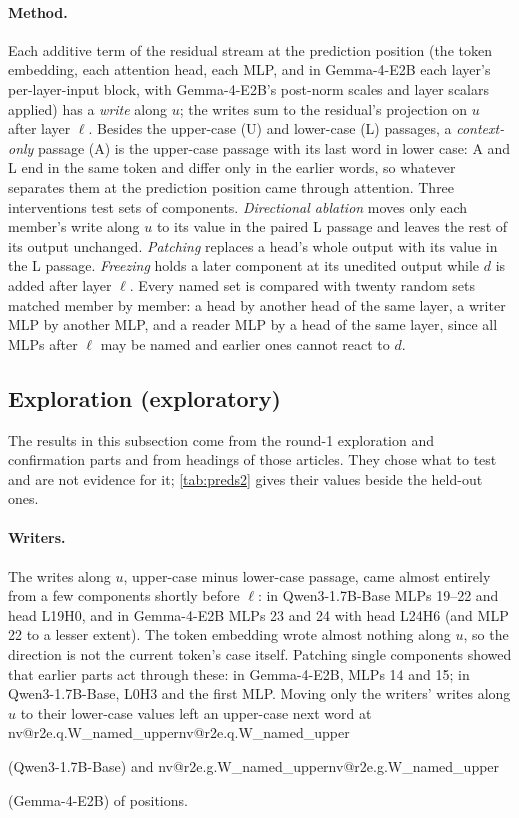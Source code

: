 \documentclass[11pt]{article}
\makeatletter
\newcommand{\nv}[1]{\ifcsname nv@#1\endcsname\csname nv@#1\endcsname\else\PackageError{numbers}{Unknown number key #1}{}\fi}
\newcommand{\gm}{Gemma-4-E2B}
\newcommand{\qw}{Qwen3-1.7B-Base}
\newcommand{\hd}[2]{L#1H#2}
\newcommand{\XQ}[1]{\nv{r2e.q.#1}}
\newcommand{\XG}[1]{\nv{r2e.g.#1}}
\makeatother
\begin{document}
\paragraph{Method.} Each additive term of the residual stream at the prediction position (the token embedding, each attention head, each MLP, and in \gm{} each layer's per-layer-input block, with \gm{}'s post-norm scales and layer scalars applied) has a \emph{write} along $u$; the writes sum to the residual's projection on $u$ after layer $\ell$. Besides the upper-case (U) and lower-case (L) passages, a \emph{context-only} passage (A) is the upper-case passage with its last word in lower case: A and L end in the same token and differ only in the earlier words, so whatever separates them at the prediction position came through attention. Three interventions test sets of components. \emph{Directional ablation} moves only each member's write along $u$ to its value in the paired L passage and leaves the rest of its output unchanged. \emph{Patching} replaces a head's whole output with its value in the L passage. \emph{Freezing} holds a later component at its unedited output while $d$ is added after layer $\ell$. Every named set is compared with twenty random sets matched member by member: a head by another head of the same layer, a writer MLP by another MLP, and a reader MLP by a head of the same layer, since all MLPs after $\ell$ may be named and earlier ones cannot react to $d$.

\subsection{Exploration (exploratory)}

The results in this subsection come from the round-1 exploration and confirmation parts and from headings of those articles. They chose what to test and are not evidence for it; \cref{tab:preds2} gives their values beside the held-out ones.

\paragraph{Writers.} The writes along $u$, upper-case minus lower-case passage, came almost entirely from a few components shortly before $\ell$: in \qw{} MLPs 19--22 and head \hd{19}{0}, and in \gm{} MLPs 23 and 24 with head \hd{24}{6} (and MLP 22 to a lesser extent). The token embedding wrote almost nothing along $u$, so the direction is not the current token's case itself. Patching single components showed that earlier parts act through these: in \gm{}, MLPs 14 and 15; in \qw{}, \hd{0}{3} and the first MLP. Moving only the writers' writes along $u$ to their lower-case values left an upper-case next word at \XQ{W_named_upper} (\qw{}) and \XG{W_named_upper} (\gm{}) of positions.
\end{document}
